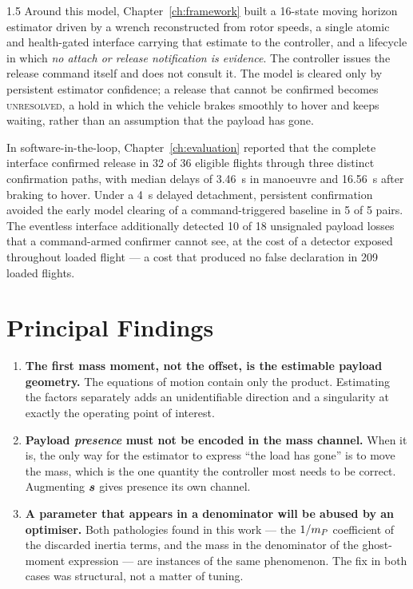 \begin{spacing}{1.5}
Around this model, Chapter~\ref{ch:framework} built a 16-state moving horizon
estimator driven by a wrench reconstructed from rotor speeds, a single atomic and
health-gated interface carrying that estimate to the controller, and a lifecycle
in which \emph{no attach or release notification is evidence}. The controller
issues the release command itself and does not consult it. The model is cleared
only by persistent estimator confidence; a release that cannot be confirmed
becomes \textsc{unresolved}, a hold in which the vehicle brakes smoothly to hover
and keeps waiting, rather than an assumption that the payload has gone.

In software-in-the-loop, Chapter~\ref{ch:evaluation} reported that the complete
interface confirmed release in 32 of 36 eligible flights through three distinct
confirmation paths, with median delays of \SI{3.46}{\second} in manoeuvre and
\SI{16.56}{\second} after braking to hover. Under a \SI{4}{\second} delayed
detachment, persistent confirmation avoided the early model clearing of a
command-triggered baseline in 5 of 5 pairs. The eventless interface additionally
detected 10 of 18 unsignaled payload losses that a command-armed confirmer cannot
see, at the cost of a detector exposed throughout loaded flight --- a cost that
produced no false declaration in 209 loaded flights.

\section{Principal Findings}

\begin{enumerate}
\item \textbf{The first mass moment, not the offset, is the estimable payload
geometry.} The equations of motion contain only the product. Estimating the
factors separately adds an unidentifiable direction and a singularity at exactly
the operating point of interest.

\item \textbf{Payload \emph{presence} must not be encoded in the mass channel.}
When it is, the only way for the estimator to express ``the load has gone'' is to
move the mass, which is the one quantity the controller most needs to be correct.
Augmenting $\bm{s}$ gives presence its own channel.

\item \textbf{A parameter that appears in a denominator will be abused by an
optimiser.} Both pathologies found in this work --- the $1/m_P$ coefficient of
the discarded inertia terms, and the mass in the denominator of the ghost-moment
expression --- are instances of the same phenomenon. The fix in both cases was
structural, not a matter of tuning.


\end{enumerate}
\end{spacing}

